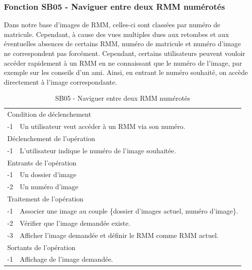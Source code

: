 \documentclass[a4paper]{article}
\begin{document}
\subsubsection{Fonction SB05 - Naviguer entre deux RMM numérotés}

Dans notre base d'images de RMM, celles-ci sont classées par numéro de matricule. Cependant, à cause des vues multiples dues aux retombes et aux éventuelles absences de certains RMM, numéro de matricule et numéro d'image ne correspondent pas forcément. Cependant, certains utilisateurs peuvent vouloir accéder rapidement à un RMM en ne connaissant que le numéro de l'image, par exemple sur les conseils d'un ami. Ainsi, en entrant le numéro souhaité, on accède directement à l'image correspondante.

\begin{table}[H]
  \centering
   \small
  \begin{tabular}{|c|p{12cm}|}
      \hline
        \rowcolor{lightgray}\multicolumn{2}{|c|}{\textbf{SB05 - Naviguer entre deux RMM numérotés}} \\
      \hline
        \multicolumn{2}{|l|}{Condition de d\'eclenchement} \\
      \hline
      -1 & Un utilisateur veut acc\'eder \`a un RMM via son numéro. \\
      \hline
        \multicolumn{2}{|l|}{D\'eclenchement de l'op\'eration} \\
      \hline
        -1 & L'utilisateur indique le numéro de l'image souhaitée. \\
      \hline
        \multicolumn{2}{|l|}{Entrants de l'op\'eration} \\
      \hline
        -1 & Un dossier d'image \\
          -2 & Un numéro d'image \\ 
      \hline
        \multicolumn{2}{|l|}{Traitement de l'op\'eration} \\
      \hline
        -1 & Associer une image au couple \{dossier d'images actuel, numéro d'image\}.  \\
          -2 & V\'erifier que l'image demand\'ee existe. \\
          -3 & Afficher l'image demand\'ee et définir le RMM comme RMM actuel. \\
      \hline
        \multicolumn{2}{|l|}{Sortants de l'op\'eration} \\
      \hline
        -1 & Affichage de l'image demand\'ee. \\
      \hline
  \end{tabular}
  \caption{SB05 - Naviguer entre deux RMM numérotés}
  \normalsize
  \label{tab:naviguer_deux_registres_numerotes}
\end{table}
\end{document}
